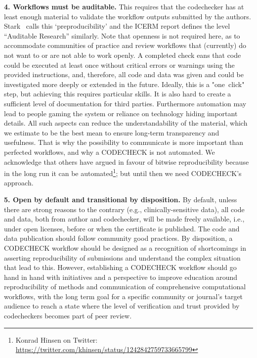 \documentclass[12pt]{article}
\begin{document}
\textbf{4. Workflows must be auditable.}
This requires that the codechecker 
has at least enough material to validate the workflow outputs submitted by 
the authors. Stark~\cite{stark_before_2018} calls this `preproducibility'
and the ICERM report \cite{stodden_setting_2013} defines the level
``Auditable Research''  similarly.
Note that openness is not required here, as to accommodate 
communities of practice and review workflows that (currently) do not want
to or are not able to work openly.
A completed check eans that code could be executed at least once without
critical errors or
warnings using the provided instructions, and, therefore, all code and data 
was given and could be investigated more deeply or extended in the future.
Ideally, this is a "one~click" step, but achieving this requires particular 
skills. It is also hard to create a sufficient level of documentation for 
third parties. Furthermore automation may lead to people gaming the system
or reliance on technology hiding important details. All such aspects can
reduce the understandability of the material, which we estimate to be the
best mean to ensure long-term transparency and usefulness.
That is why the possibility to communicate is more important
than perfected workflows, and why a CODECHECK is not automated.
We acknowledge that others have argued in favour of bitwise reproducibility
because in the long run it can be automated\footnote{Konrad Hinsen on 
Twitter: \url{https://twitter.com/khinsen/status/1242842759733665799}};
but until then we need CODECHECK's approach.

\textbf{5. Open by default and transitional by disposition.} %
By default, unless there are strong
reasons to the contrary (e.g., clinically-sensitive data), all code and
data, both from author and codechecker, will be made freely available, i.e., 
under open licenses, before or when the certificate is published.
The code and data  publication should follow community good practices.
By disposition, a CODECHECK workflow should be designed as a recognition of
shortcomings in asserting reproducibility of submissions and understand the
complex situation that lead to this. However, establishing a CODECHECK workflow
should go hand in hand with initiatives and a perspective to improve education
around reproducibility of methods and communication of comprehensive 
computational workflows, with the long term goal for a specific community or
journal's target audience to reach a state where the level of verification 
and trust provided by codecheckers becomes part of peer review.
\end{document}
